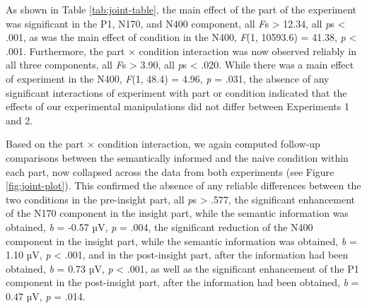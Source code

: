 \documentclass[
  english,
  man,12pt,twoside]{apa7}
\begin{document}
As shown in Table \ref{tab:joint-table}, the main effect of the part of the experiment was significant in the P1, N170, and N400 component, all \emph{F}s \textgreater{} 12.34, all \emph{p}s \textless{} .001, as was the main effect of condition in the N400, \emph{F}(1, 10593.6) = 41.38, \emph{p} \textless{} .001. Furthermore, the part × condition interaction was now observed reliably in all three components, all \emph{F}s \textgreater{} 3.90, all \emph{p}s \textless{} .020. While there was a main effect of experiment in the N400, \emph{F}(1, 48.4) = 4.96, \emph{p} = .031, the absence of any significant interactions of experiment with part or condition indicated that the effects of our experimental manipulations did not differ between Experiments 1 and 2.

Based on the part × condition interaction, we again computed follow-up comparisons between the semantically informed and the naive condition within each part, now collapsed across the data from both experiments (see Figure \ref{fig:joint-plot}). This confirmed the absence of any reliable differences between the two conditions in the pre-insight part, all \emph{p}s \textgreater{} .577, the significant enhancement of the N170 component in the insight part, while the semantic information was obtained, \emph{b} = -0.57 µV, \emph{p} = .004, the significant reduction of the N400 component in the insight part, while the semantic information was obtained, \emph{b} = 1.10 µV, \emph{p} \textless{} .001, and in the post-insight part, after the information had been obtained, \emph{b} = 0.73 µV, \emph{p} \textless{} .001, as well as the significant enhancement of the P1 component in the post-insight part, after the information had been obtained, \emph{b} = 0.47 µV, \emph{p} = .014.
\end{document}
